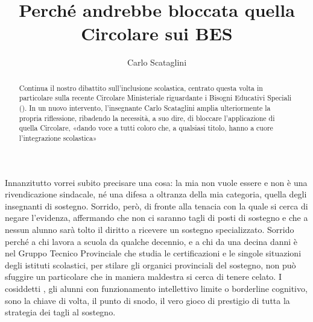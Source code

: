 \author{Carlo Scataglini}
\title{Perché andrebbe bloccata quella Circolare sui BES}
\label{cha:scataglini170613}
\begin{abstract}
Continua il nostro dibattito sull'inclusione scolastica, centrato questa volta in particolare sulla recente Circolare Ministeriale riguardante i Bisogni Educativi Speciali (). In un nuovo intervento, l'insegnante Carlo Scataglini amplia ulteriormente la propria riflessione, ribadendo la necessità, a suo dire, di bloccare l'applicazione di quella Circolare, «dando voce a tutti coloro che, a qualsiasi titolo, hanno a cuore l'integrazione scolastica»
\end{abstract}
\maketitle
{}
Innanzitutto vorrei subito precisare una cosa: la mia non vuole essere e non è una rivendicazione sindacale, né una difesa a oltranza della mia categoria, quella degli insegnanti di sostegno. Sorrido, però, di fronte alla tenacia con la quale si cerca di negare l'evidenza, affermando che non ci saranno tagli di posti di sostegno e che a nessun alunno sarà tolto il diritto a ricevere un sostegno specializzato. Sorrido perché a chi lavora a scuola da qualche decennio, e a chi da una decina danni è nel Gruppo Tecnico Provinciale che studia le certificazioni e le singole situazioni degli istituti scolastici, per stilare gli organici provinciali del sostegno, non può sfuggire un particolare che in maniera maldestra si cerca di tenere celato. I cosiddetti , gli alunni con funzionamento intellettivo limite o borderline cognitivo, sono la chiave di volta, il punto di snodo, il vero gioco di prestigio di tutta la strategia dei tagli al sostegno.

